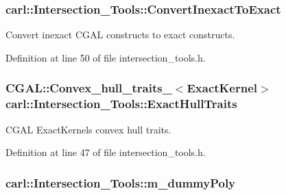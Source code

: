\subsubsection[{Convert\+Inexact\+To\+Exact}]{ carl\+::\+Intersection\+\_\+\+Tools\+::\+Convert\+Inexact\+To\+Exact\hspace{0.3cm}{\ttfamily [protected]}}\label{classcarl_1_1_intersection___tools_a89118c79160362561c0cf7f1743568a6}


Convert inexact C\+G\+A\+L constructs to exact constructs. 



Definition at line 50 of file intersection\+\_\+tools.\+h.

\hypertarget{classcarl_1_1_intersection___tools_a0a3b4e978977cd29ebac810dc0a2baf6}{}
\subsubsection[{Exact\+Hull\+Traits}]{\setlength{\rightskip}{0pt plus 5cm}C\+G\+A\+L\+::\+Convex\+\_\+hull\+\_\+traits\+\_$<${\bf Exact\+Kernel}$>$ carl\+::\+Intersection\+\_\+\+Tools\+::\+Exact\+Hull\+Traits\hspace{0.3cm}{\ttfamily [protected]}}\label{classcarl_1_1_intersection___tools_a0a3b4e978977cd29ebac810dc0a2baf6}


C\+G\+A\+L Exact\+Kernel\textquotesingle{}s convex hull traits. 



Definition at line 47 of file intersection\+\_\+tools.\+h.

\hypertarget{classcarl_1_1_intersection___tools_a1bc3cab10caf53e5de762c4dea2ef1ba}{}
\subsubsection[{m\+\_\+dummy\+Poly}]{ carl\+::\+Intersection\+\_\+\+Tools\+::m\+\_\+dummy\+Poly\hspace{0.3cm}{\ttfamily [protected]}}\label{classcarl_1_1_intersection___tools_a1bc3cab10caf53e5de762c4dea2ef1ba}


